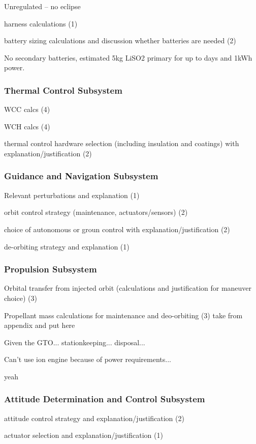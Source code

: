 \documentclass[9pt]{article}
\begin{document}
Unregulated -- no eclipse



harness calculations (1)

battery sizing calculations and discussion whether batteries are needed (2)

No secondary batteries, estimated 5kg LiSO2 primary for up to days and 1kWh power.

\subsubsection{Thermal Control Subsystem}\label{sys:thermal}
WCC calcs (4)

WCH calcs (4)

thermal control hardware selection (including insulation and coatings) with explanation/justification (2)

\subsubsection{Guidance and Navigation Subsystem}\label{sys:nav}
Relevant perturbations and explanation (1)

orbit control strategy (maintenance, actuators/sensors) (2)

choice of autonomous or groun control with explanation/justification (2)

de-orbiting strategy and explanation (1)

\subsubsection{Propulsion Subsystem}\label{sys:prop}
Orbital transfer from injected orbit (calculations and justification for maneuver choice) (3)

Propellant mass calculations for maintenance and deo-orbiting (3) take from appendix and put here

Given the GTO... stationkeeping... disposal...

Can't use ion engine because of power requirements...\cite{next}

yeah
\subsubsection{Attitude Determination and Control Subsystem}\label{sys:adcs}
attitude control strategy and explanation/justification (2)

actuator selection and explanation/justification (1)
\end{document}
